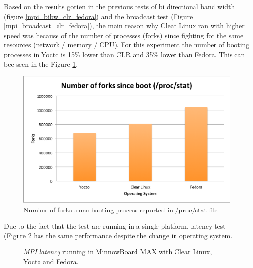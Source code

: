 Based on the results gotten in the previous tests of bi directional band
width (figure \ref{mpi_bibw_clr_fedora}) and the broadcast test (Figure
\ref{mpi_broadcast_clr_fedora}), the main reason why Clear Linux ran with
higher speed was because of the number of processes (forks) since fighting for
the same resources (network / memory / CPU). For this experiment the number of
booting processes in Yocto is 15\% lower than CLR and 35\%
lower than Fedora. This can bee seen in the Figure \ref{number_forks_yocto}.

\begin{figure}[H]
\centering
\includegraphics[width=1 \textwidth]{images/number_forks_yocto.png}
\caption{Number of forks since booting process reported in /proc/stat file }
\label{number_forks_yocto}
\end{figure}

Due to the fact that the test are running in a single platform, latency test (Figure
\ref{mpi_latency_yocto} has the same performance despite the change in
operating system.

\begin{figure}[H]
\begin{center}
\end{center}
\caption{\textit{MPI latency} running in  MinnowBoard MAX  with Clear Linux,
Yocto and Fedora.}
\label{mpi_latency_yocto}
\end{figure}

